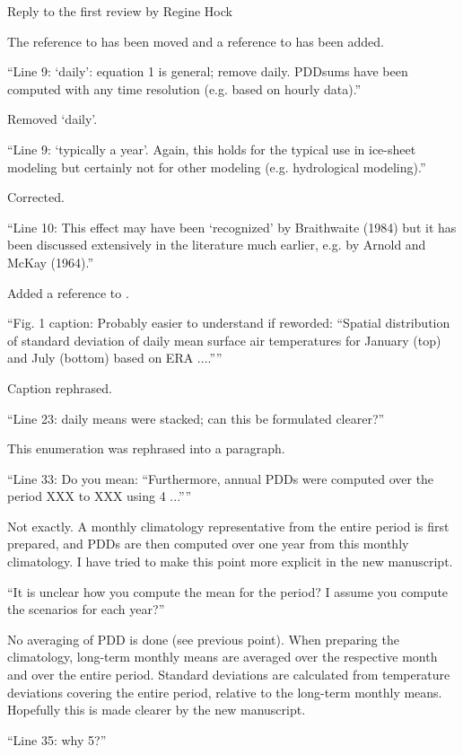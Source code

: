 \documentclass{letter}
\newcommand{\rev}[0]{\color{blue!50!black}\it}
\newcommand{\revpoint}[1]{{\rev\item``#1''}}
\begin{document}
\begin{letter}{Reply to the first review by Regine Hock}
\begin{enumerate}[resume]
    The reference to \citet{braithwaite-1984} has been moved and a reference to \citet{hock-2003} has been added.

    \revpoint{Line 9: ‘daily’: equation 1 is general; remove daily. PDDsums have been computed with any time resolution (e.g. based on hourly data).}

    Removed `daily'.

    \revpoint{Line 9: ‘typically a year’. Again, this holds for the typical use in ice-sheet modeling but certainly not for other modeling (e.g. hydrological modeling).}

    Corrected.

    \revpoint{Line 10: This effect may have been ‘recognized’ by Braithwaite (1984) but it has been discussed extensively in the literature much earlier, e.g. by Arnold and McKay (1964).}

    Added a reference to \citet{arnold-mackay-1964}.

    \revpoint{Fig. 1 caption: Probably easier to understand if reworded: “Spatial distribution of standard deviation of daily mean surface air temperatures for January (top) and July (bottom) based on ERA ....”}

    Caption rephrased.

    \revpoint{Line 23: daily means were stacked; can this be formulated clearer?}

    This enumeration was rephrased into a paragraph.

    \revpoint{Line 33: Do you mean: “Furthermore, annual PDDs were computed over the period XXX to XXX using 4 ...”}

    Not exactly. A monthly climatology representative from the entire period is first prepared, and PDDs are then computed over one year from this monthly climatology. I have tried to make this point more explicit in the new manuscript.

    \revpoint{It is unclear how you compute the mean for the period? I assume you compute the scenarios for each year?}

    No averaging of PDD is done (see previous point). When preparing the climatology, long-term monthly means are averaged over the respective month and over the entire period. Standard deviations are calculated from temperature deviations covering the entire period, relative to the long-term monthly means. Hopefully this is made clearer by the new manuscript.

    \revpoint{Line 35: why 5?}


\end{enumerate}
\end{letter}
\end{document}
